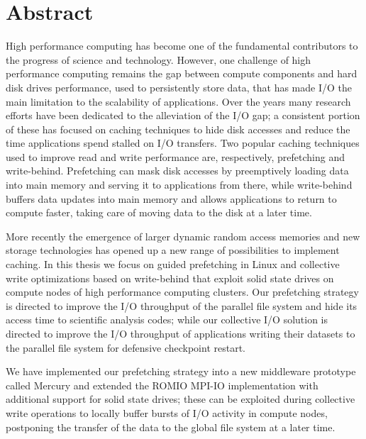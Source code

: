 \documentclass[a4paper,titlepage,oneside,11pt]{book}
\begin{document}
\newpage
\thispagestyle{empty}
\newpage
\thispagestyle{empty}
\null
\newpage
{}\setcounter{page}{1}
\chapter*{\centering \small Abstract}%
High performance computing has become one of the fundamental contributors to the progress of science and technology. However, one challenge of high performance computing remains 
the gap between compute components and hard disk drives performance, used to persistently store data, that has made I/O the main limitation to the scalability of applications.
Over the years many research efforts have been dedicated to the alleviation of the I/O gap; a consistent portion of these has focused on caching techniques to hide disk accesses 
and reduce the time applications spend stalled on I/O transfers. Two popular caching techniques used to improve read and write performance are, respectively, prefetching and 
write-behind. Prefetching can mask disk accesses by preemptively loading data into main memory and serving it to applications from there, while write-behind buffers data updates 
into main memory and allows applications to return to compute faster, taking care of moving data to the disk at a later time.

More recently the emergence of larger dynamic random access memories and new storage technologies has opened up a new range of possibilities to implement caching. In this thesis 
we focus on guided prefetching in Linux and collective write optimizations based on write-behind that exploit solid state drives on compute nodes of high performance computing clusters.
Our prefetching strategy is directed to improve the I/O throughput of the parallel file system and hide its access time to scientific analysis codes; while our collective I/O solution 
is directed to improve the I/O throughput of applications writing their datasets to the parallel file system for defensive checkpoint restart.

We have implemented our prefetching strategy into a new middleware prototype called Mercury and extended the ROMIO MPI-IO implementation with additional support for solid state
drives; these can be exploited during collective write operations to locally buffer bursts of I/O activity in compute nodes, postponing the transfer of the data to the global file
system at a later time. 
\end{document}

